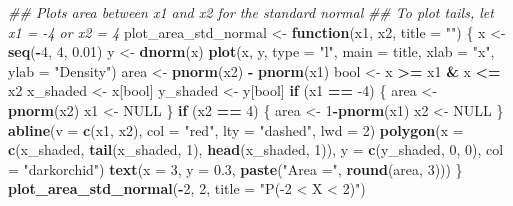 \documentclass[
]{book}
\newenvironment{Shaded}{\begin{snugshade}}{\end{snugshade}}
\newcommand{\CommentTok}[1]{\textcolor[rgb]{0.56,0.35,0.01}{\textit{#1}}}
\newcommand{\ControlFlowTok}[1]{\textcolor[rgb]{0.13,0.29,0.53}{\textbf{#1}}}
\newcommand{\DataTypeTok}[1]{\textcolor[rgb]{0.13,0.29,0.53}{#1}}
\newcommand{\DecValTok}[1]{\textcolor[rgb]{0.00,0.00,0.81}{#1}}
\newcommand{\FloatTok}[1]{\textcolor[rgb]{0.00,0.00,0.81}{#1}}
\newcommand{\KeywordTok}[1]{\textcolor[rgb]{0.13,0.29,0.53}{\textbf{#1}}}
\newcommand{\NormalTok}[1]{#1}
\newcommand{\OperatorTok}[1]{\textcolor[rgb]{0.81,0.36,0.00}{\textbf{#1}}}
\newcommand{\OtherTok}[1]{\textcolor[rgb]{0.56,0.35,0.01}{#1}}
\newcommand{\StringTok}[1]{\textcolor[rgb]{0.31,0.60,0.02}{#1}}
\begin{document}
\begin{Shaded}
\begin{Highlighting}[]
\CommentTok{## Plots area between x1 and x2 for the standard normal}
\CommentTok{## To plot tails, let x1 = -4 or x2 = 4}
\NormalTok{plot_area_std_normal <-}\StringTok{ }\ControlFlowTok{function}\NormalTok{(x1, x2, }\DataTypeTok{title =} \StringTok{""}\NormalTok{) \{}
\NormalTok{    x <-}\StringTok{ }\KeywordTok{seq}\NormalTok{(}\OperatorTok{-}\DecValTok{4}\NormalTok{, }\DecValTok{4}\NormalTok{, }\FloatTok{0.01}\NormalTok{)}
\NormalTok{    y <-}\StringTok{ }\KeywordTok{dnorm}\NormalTok{(x)}
    \KeywordTok{plot}\NormalTok{(x, y, }\DataTypeTok{type =} \StringTok{"l"}\NormalTok{, }\DataTypeTok{main =}\NormalTok{ title, }\DataTypeTok{xlab =} \StringTok{"x"}\NormalTok{, }\DataTypeTok{ylab =} \StringTok{"Density"}\NormalTok{)}
\NormalTok{    area <-}\StringTok{ }\KeywordTok{pnorm}\NormalTok{(x2) }\OperatorTok{-}\StringTok{ }\KeywordTok{pnorm}\NormalTok{(x1)}
\NormalTok{    bool <-}\StringTok{ }\NormalTok{x }\OperatorTok{>=}\StringTok{ }\NormalTok{x1 }\OperatorTok{&}\StringTok{ }\NormalTok{x }\OperatorTok{<=}\StringTok{ }\NormalTok{x2}
\NormalTok{    x_shaded <-}\StringTok{ }\NormalTok{x[bool]}
\NormalTok{    y_shaded <-}\StringTok{ }\NormalTok{y[bool]}
    \ControlFlowTok{if}\NormalTok{ (x1 }\OperatorTok{==}\StringTok{ }\DecValTok{-4}\NormalTok{) \{}
\NormalTok{        area <-}\StringTok{ }\KeywordTok{pnorm}\NormalTok{(x2)}
\NormalTok{        x1 <-}\StringTok{ }\OtherTok{NULL}
\NormalTok{    \}}
    \ControlFlowTok{if}\NormalTok{ (x2 }\OperatorTok{==}\StringTok{ }\DecValTok{4}\NormalTok{) \{}
\NormalTok{        area <-}\StringTok{ }\DecValTok{1}\OperatorTok{-}\KeywordTok{pnorm}\NormalTok{(x1)}
\NormalTok{        x2 <-}\StringTok{ }\OtherTok{NULL}
\NormalTok{    \}}
    \KeywordTok{abline}\NormalTok{(}\DataTypeTok{v =} \KeywordTok{c}\NormalTok{(x1, x2), }\DataTypeTok{col =} \StringTok{"red"}\NormalTok{, }\DataTypeTok{lty =} \StringTok{"dashed"}\NormalTok{, }\DataTypeTok{lwd =} \DecValTok{2}\NormalTok{)}
    \KeywordTok{polygon}\NormalTok{(}\DataTypeTok{x =} \KeywordTok{c}\NormalTok{(x_shaded, }\KeywordTok{tail}\NormalTok{(x_shaded, }\DecValTok{1}\NormalTok{), }\KeywordTok{head}\NormalTok{(x_shaded, }\DecValTok{1}\NormalTok{)), }\DataTypeTok{y =} \KeywordTok{c}\NormalTok{(y_shaded, }\DecValTok{0}\NormalTok{, }\DecValTok{0}\NormalTok{), }\DataTypeTok{col =} \StringTok{"darkorchid"}\NormalTok{)}
    \KeywordTok{text}\NormalTok{(}\DataTypeTok{x =} \DecValTok{3}\NormalTok{, }\DataTypeTok{y =} \FloatTok{0.3}\NormalTok{, }\KeywordTok{paste}\NormalTok{(}\StringTok{"Area ="}\NormalTok{, }\KeywordTok{round}\NormalTok{(area, }\DecValTok{3}\NormalTok{)))}
\NormalTok{\}}
\KeywordTok{plot_area_std_normal}\NormalTok{(}\OperatorTok{-}\DecValTok{2}\NormalTok{, }\DecValTok{2}\NormalTok{, }\DataTypeTok{title =} \StringTok{"P(-2 < X < 2)"}\NormalTok{)}
\end{Highlighting}
\end{Shaded}
\end{document}
